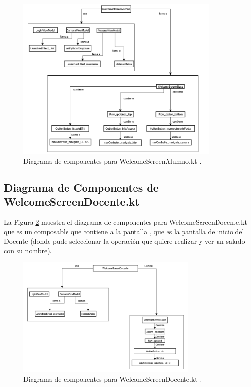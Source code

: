 \begin{figure}[htbp!]
	\begin{center}
		\includegraphics[width=0.9\textwidth]{DiagramasMoviles/DCM (35)}
		\caption{Diagrama de componentes para WelcomeScreenAlumno.kt .}
		\label{fig:Componentes_22}
	\end{center}
\end{figure}

\newpage

\subsection{Diagrama de Componentes de WelcomeScreenDocente.kt}

La Figura \ref{fig:Componentes_23} muestra el diagrama de componentes para WelcomeScreenDocente.kt que es un composable que contiene a la pantalla , que es la pantalla de inicio del Docente (donde pude seleccionar la operación que quiere realizar y ver un saludo con su nombre).

\begin{figure}[htbp!]
	\begin{center}
		\includegraphics[width=0.8\textwidth]{DiagramasMoviles/DCM (36)}
		\caption{Diagrama de componentes para WelcomeScreenDocente.kt .}
		\label{fig:Componentes_23}
	\end{center}
\end{figure}

